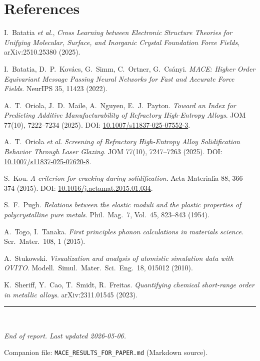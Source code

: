 \documentclass[11pt,a4paper]{article}
\begin{document}
\section*{References}

\begin{enumerate}[\,{[}1{]}]
  \item I.~Batatia \emph{et al.}, \emph{Cross Learning between Electronic
        Structure Theories for Unifying Molecular, Surface, and Inorganic
        Crystal Foundation Force Fields}, arXiv:2510.25380 (2025).
  \item I.~Batatia, D.~P.~Kov\'acs, G.~Simm, C.~Ortner, G.~Cs\'anyi.
        \emph{MACE: Higher Order Equivariant Message Passing Neural
        Networks for Fast and Accurate Force Fields}. NeurIPS 35, 11423
        (2022).
  \item A.~T.~Oriola, J.~D.~Maile, A.~Nguyen, E.~J.~Payton.
        \emph{Toward an Index for Predicting Additive Manufacturability of
        Refractory High-Entropy Alloys}. JOM 77(10), 7222--7234 (2025).
        DOI: \href{https://doi.org/10.1007/s11837-025-07552-3}{10.1007/s11837-025-07552-3}.
  \item A.~T.~Oriola \emph{et al.} \emph{Screening of Refractory High-Entropy
        Alloy Solidification Behavior Through Laser Glazing}. JOM 77(10),
        7247--7263 (2025). DOI:
        \href{https://doi.org/10.1007/s11837-025-07620-8}{10.1007/s11837-025-07620-8}.
  \item S.~Kou. \emph{A criterion for cracking during solidification}. Acta
        Materialia 88, 366--374 (2015). DOI:
        \href{https://doi.org/10.1016/j.actamat.2015.01.034}{10.1016/j.actamat.2015.01.034}.
  \item S.~F.~Pugh. \emph{Relations between the elastic moduli and the
        plastic properties of polycrystalline pure metals}. Phil.\ Mag.\ 7,
        Vol.\ 45, 823--843 (1954).
  \item A.~Togo, I.~Tanaka. \emph{First principles phonon calculations in
        materials science}. Scr.\ Mater.\ 108, 1 (2015).
  \item A.~Stukowski. \emph{Visualization and analysis of atomistic
        simulation data with OVITO}. Modell.\ Simul.\ Mater.\ Sci.\ Eng.\ 18,
        015012 (2010).
  \item K.~Sheriff, Y.~Cao, T.~Smidt, R.~Freitas. \emph{Quantifying chemical
        short-range order in metallic alloys}. arXiv:2311.01545 (2023).
\end{enumerate}

\vspace{1em}
\rule{\textwidth}{0.4pt}\\
{\small\itshape End of report. Last updated 2026-05-06.\par
Companion file: \texttt{MACE\_RESULTS\_FOR\_PAPER.md} (Markdown source).}
\end{document}
